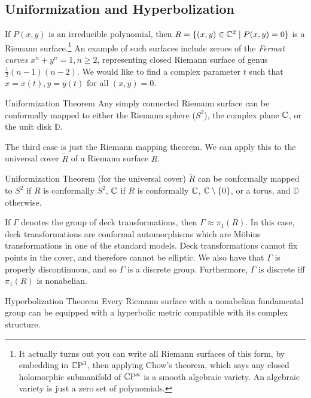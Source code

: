 \subsection{Uniformization and Hyperbolization}
If $P(x,y)$ is an irreducible polynomial, then $R= \{(x,y) \in \mathbb{C}^2 \mid P(x,y)=0\} $ is a Riemann surface.\footnote{It actually turns out you can write all Riemann surfaces of this form, by embedding in $\mathbb{C}\mathrm{P}^3$, then applying Chow's theorem, which says any closed holomorphic submanifold of $\mathbb{C}\mathrm{P}^n $ is a smooth algebraic variety. An algebraic variety is just a zero set of polynomials.} An example of such surfaces include zeroes of the \emph{Fermat curves} $x^n+y^n =1,n\geq 2$, representing closed Riemann surface of genus $\frac{1}{2}(n-1)(n-2)$. We would like to find a complex parameter $t$ such that $x=x(t),y=y(t)$ for all $(x,y)=0$.
\begin{namedthm}{Uniformization Theorem} 
    Any simply connected Riemann surface can be conformally mapped to either the Riemann sphere ($S^2$), the complex plane $\mathbb{C}$, or the unit disk $\mathbb D$.  
\end{namedthm}
The third case is just the Riemann mapping theorem. We can apply this to the universal cover $\widetilde R$ of a Riemann surface $R$.
\begin{namedthm}{Uniformization Theorem (for the universal cover)} 
   $\widetilde R$ can be conformally mapped to $S^2$ if $R$ is conformally $S^2$, $\mathbb{C}$ if $R$ is conformally $\mathbb{C}$, $\mathbb{C}\setminus \{0\} $, or a torus, and $\mathbb D$ otherwise. 
\end{namedthm}
If $\Gamma$ denotes the group of deck transformations, then $\Gamma \approx \pi_1(R)$. In this case, deck transformations are conformal automorphisms which are M\"obius transformations in one of the standard models. Deck transformations cannot fix points in the cover, and therefore cannot be elliptic. We also have that $\Gamma$ is properly discontinuous, and so $\Gamma $ is a discrete group. Furthermore, $\Gamma$ is discrete iff  $\pi_1(R)$ is nonabelian.
\begin{namedthm}{Hyperbolization Theorem} 
Every Riemann surface with a nonabelian fundamental group can be equipped with a hyperbolic metric compatible with its complex structure.
\end{namedthm}
